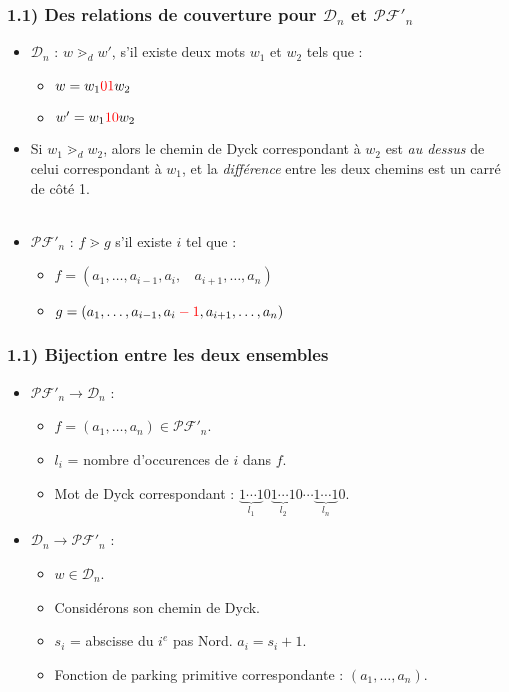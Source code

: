\documentclass{beamer}
\begin{document}
\begin{frame}
    \frametitle{1.1) Des relations de couverture pour $\mathcal{D}_n$ et
        $\mathcal{PF'}_n$}
    \begin{itemize}
        \item $\mathcal{D}_n$ : $w \gtrdot_d w'$, s'il existe deux mots
            $w_1$ et $w_2$ tels que :
        \begin{itemize}
            \item $w = w_1\color{red}01\color{black}w_2$
            \item $w' = w_1\color{red}10\color{black}w_2$
        \end{itemize} 
        \item  Si $w_1 \gtrdot_d w_2$, alors le chemin de Dyck correspondant
        à $w_2$ est \emph{au dessus} de celui correspondant à $w_1$, et la
        \emph{différence} entre les deux chemins est un carré de côté 1.
        \\~\\
        \item $\mathcal{PF'}_n$ : $f \gtrdot g$ s'il existe $i$ tel que :
        \begin{itemize}
            \item $f = (a_1, \ldots, a_{i-1}, a_i,\ \ \ \ 
                a_{i+1}, \ldots, a_n)$
            \item $g = (a_1, \ldots, a_{i-1}, a_i \color{red} - 1\color{black}
                , a_{i+1}, \ldots, a_n)$
        \end{itemize}
    \end{itemize}
\end{frame}

\begin{frame}
    \frametitle{1.1) \textbf{Bijection} entre les deux ensembles}
    \begin{itemize}
        \item $\mathcal{PF'}_n \to \mathcal{D}_n$ :
        \begin{itemize}
            \item $f = (a_1, \ldots, a_n) \in \mathcal{PF'}_n$.
            \item $l_i$ = nombre d'occurences de $i$ dans $f$.
            \item Mot de Dyck correspondant : $\underbrace{1 \cdots 1}_{l_1}
                0\underbrace{1 \cdots 1}_{l_2}0 \cdots\underbrace{1 \cdots
                1}_{l_n}0$.
        \end{itemize}
        \item $\mathcal{D}_n \to \mathcal{PF'}_n$ :
        \begin{itemize}
            \item $w \in \mathcal{D}_n$.
            \item Considérons son chemin de Dyck.
            \item $s_i$ = abscisse du $i^{e}$ pas Nord. $a_i = s_i + 1$.
            \item Fonction de parking primitive correspondante :
                $(a_1, \ldots, a_n)$.
        \end{itemize}
    \end{itemize}
\end{frame}
\end{document}
